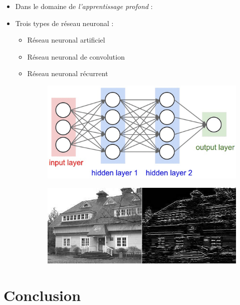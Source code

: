 \documentclass{beamer}
\begin{document}
\begin{frame}
    \begin{itemize}[<+-| alert@+>] %
        \item Dans le domaine de \textit{l'apprentissage profond} : 
        \item Trois types de réseau neuronal :
        \begin{itemize}[<+-| alert@+>] %
            \item Réseau neuronal artificiel 
            \item Réseau neuronal de convolution
            \item Réseau neuronal récurrent
            \begin{figure}
                \centering
                \includegraphics[width=0.5\linewidth]{pic/ffnet.png}
            \end{figure}
            \begin{figure}
                \centering
                \includegraphics[width=0.5\linewidth]{pic/conv.jpeg}
            \end{figure}
        \end{itemize}
    \end{itemize}
\end{frame}

\section{Conclusion}
\end{document}
